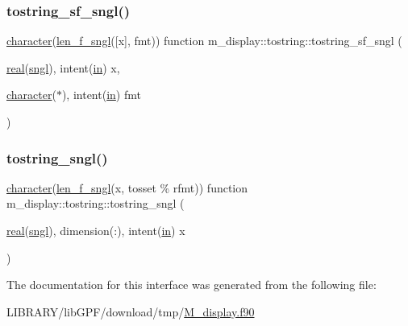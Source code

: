 \mbox{\label{interfacem__display_1_1tostring_a478a6d2bd149142f66ce4d44a07d9eed}} 
\subsubsection{\texorpdfstring{tostring\+\_\+sf\+\_\+sngl()}{tostring\_sf\_sngl()}}
{\footnotesize\ttfamily \hyperlink{option__stopwatch_83_8txt_abd4b21fbbd175834027b5224bfe97e66}{character}(\hyperlink{namespacem__display_ae0feb946fbc4c31f8ba53e20719fa508}{len\+\_\+f\+\_\+sngl}(\mbox{[}x\mbox{]}, fmt)) function m\+\_\+display\+::tostring\+::tostring\+\_\+sf\+\_\+sngl (\begin{DoxyParamCaption}\item[{\hyperlink{read__watch_83_8txt_abdb62bde002f38ef75f810d3a905a823}{real}(\hyperlink{namespacem__display_a2ac86bc535c3ccc5947dbb3109c666b5}{sngl}), intent(\hyperlink{M__journal_83_8txt_afce72651d1eed785a2132bee863b2f38}{in})}]{x,  }\item[{\hyperlink{option__stopwatch_83_8txt_abd4b21fbbd175834027b5224bfe97e66}{character}($\ast$), intent(\hyperlink{M__journal_83_8txt_afce72651d1eed785a2132bee863b2f38}{in})}]{fmt }\end{DoxyParamCaption})\hspace{0.3cm}{\ttfamily [private]}}

\mbox{\label{interfacem__display_1_1tostring_af054989252fce8a13f67a66b4155665a}} 
\subsubsection{\texorpdfstring{tostring\+\_\+sngl()}{tostring\_sngl()}}
{\footnotesize\ttfamily \hyperlink{option__stopwatch_83_8txt_abd4b21fbbd175834027b5224bfe97e66}{character}(\hyperlink{namespacem__display_ae0feb946fbc4c31f8ba53e20719fa508}{len\+\_\+f\+\_\+sngl}(x, tosset \% rfmt)) function m\+\_\+display\+::tostring\+::tostring\+\_\+sngl (\begin{DoxyParamCaption}\item[{\hyperlink{read__watch_83_8txt_abdb62bde002f38ef75f810d3a905a823}{real}(\hyperlink{namespacem__display_a2ac86bc535c3ccc5947dbb3109c666b5}{sngl}), dimension(\+:), intent(\hyperlink{M__journal_83_8txt_afce72651d1eed785a2132bee863b2f38}{in})}]{x }\end{DoxyParamCaption})\hspace{0.3cm}{\ttfamily [private]}}



The documentation for this interface was generated from the following file\+:\begin{DoxyCompactItemize}
\item 
L\+I\+B\+R\+A\+R\+Y/lib\+G\+P\+F/download/tmp/\hyperlink{M__display_8f90}{M\+\_\+display.\+f90}\end{DoxyCompactItemize}
